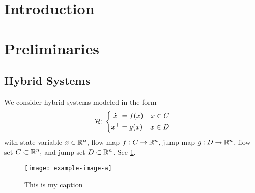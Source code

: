 
\begin{abstract}%
    \lipsum[1]
\end{abstract}
 

\section{Introduction}
\label{sec:intro}
\lipsum[2-3]

\section{Preliminaries}
\label{sec:preliminaries}

\lipsum[4-6]

\subsection{Hybrid Systems}
We consider hybrid systems modeled in the form \cite{goebel_hybrid_2012}
\begin{equation}
    {\mathcal{H}}{:}\: \left\{\begin{aligned}
        \dot{x} \hspace{4pt}&= f(x) & x \in C \\
        x^+ &= g(x) & x \in D
    \end{aligned}\right. 
    \label{eq:hybrid system}
\end{equation}
with state variable $x\in \mathbb{R}^{n}$, 
flow map $f : C \to \mathbb{R}^{n}$, 
jump map $g : D \to \mathbb{R}^{n}$, 
flow set $C \subset \mathbb{R}^{n},$ and
jump set $D \subset \mathbb{R}^{n}$.
See \cref{fig:this is a figure}.

\begin{figure}[htbp]
    \centering
    \texttt{[image: example-image-a]}
    \caption{This is my caption}
    \label{fig:this is a figure}
\end{figure}

